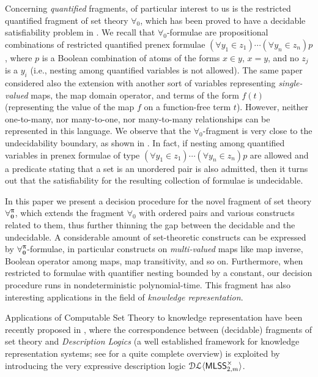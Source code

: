 \documentclass[a4paper,UKenglish]{lipics}
\newcommand{\Lang}{\ensuremath{\mathbf{\forall_{0}^{\pi}}}\xspace}
\begin{document}
Concerning \emph{quantified} fragments, of particular interest to
us is the restricted quantified fragment of set theory $\forall_{0}$,
which has been proved to have a decidable satisfiability problem in
\cite{BreFerOmoSch1981}.  We recall that $\forall_{0}$-formulae are
propositional combinations of restricted quantified prenex formulae
$(\forall y_1 \in z_1) \cdots (\forall y_n \in z_n)p$, where $p$ is a
Boolean combination of atoms of the forms $x \in y$, $x=y$, and no
$z_j$ is a $y_i$ (i.e., nesting among quantified variables is not
allowed).  The same paper considered also the extension with another
sort of variables representing \emph{single-valued} maps, the map
domain operator, and terms of the form $f(t)$ (representing the value
of the map $f$ on a function-free term $t$).  However, neither
one-to-many, nor many-to-one, nor many-to-many relationships can be
represented in this language.  We observe that the
$\forall_{0}$-fragment is very close to the undecidability boundary,
as shown in \cite{ParPol93}. In fact, if nesting among quantified variables 
in prenex formulae of type $(\forall y_1 \in z_1) \cdots (\forall y_n
\in z_n)p$ are allowed and a predicate stating that a set is an 
unordered pair is also admitted, then it turns out that the 
satisfiability for the 
resulting collection of formulae is undecidable.

In this paper we present a decision procedure for the novel
fragment of set theory \Lang, which extends the fragment $\forall_{0}$
with ordered pairs and various constructs related to them, thus 
further thinning the gap between the decidable and the undecidable.
% 
A considerable amount of set-theoretic constructs can be expressed 
by \Lang-formulae, in particular constructs on \emph{multi-valued} maps
like map inverse, Boolean operator among maps, map transitivity, and
so on.  Furthermore, when restricted to formulae with quantifier
nesting bounded by a constant, our decision procedure runs in
nondeterministic polynomial-time.  This fragment has also interesting
applications in the field of \emph{knowledge representation}.

Applications of Computable Set Theory to knowledge representation have
been recently proposed in \cite{CanLonPis2010}, where the
correspondence between (decidable) fragments of set theory and
\emph{Description Logics} (a well established framework for knowledge
representation systems; see \cite{DLHANDBOOK} for a quite complete
overview) is exploited by introducing the very expressive description
logic $\mathcal{DL\langle}\mathsf{MLSS}_{2,m}^{\times}\mathcal{\rangle}$.
\end{document}
